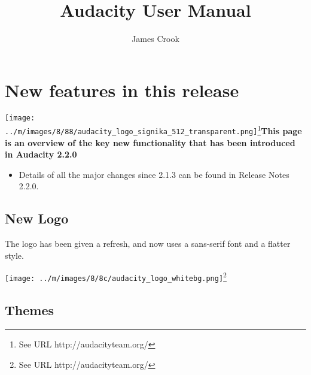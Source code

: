 \documentclass[twocolumn]{book}
\begin{document}
{\let\cleardoublepage\clearpage 
\title{Audacity User Manual}
\author{James Crook}
}


																					
\chapter{New features in this release}

\label{f0}																																	%
					

\par\texttt{[image: ../m/images/8/88/audacity\_logo\_signika\_512\_transparent.png]}\footnote{See URL http://audacityteam.org/}\newline\textbf{This page is an overview of the key new functionality that has been introduced in Audacity 2.2.0}
\begin{itemize}
\item  Details of all the major changes since 2.1.3 can be found in Release Notes 2.2.0.
\end{itemize}





\section{New Logo}


The logo has been given a refresh, and now uses a sans-serif font and a flatter style.

\par\texttt{[image: ../m/images/8/8c/audacity\_logo\_whitebg.png]}\footnote{See URL http://audacityteam.org/}


\section{Themes}
\end{document}
